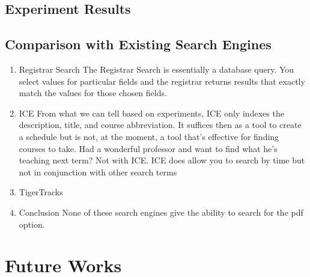 \documentclass[12pt,letterpaper]{article}
\begin{document}
	\subsection{Experiment Results}
	\subsection{Comparison with Existing Search Engines}
		\begin{enumerate}
			\item Registrar Search
				The Registrar Search is essentially a database query. You select values for particular fields and the registrar returns results that exactly match the values for those chosen fields.
			
			\item ICE
				From what we can tell based on experiments, ICE only indexes the description, title, and course abbreviation. It suffices then as a tool to create a schedule but is not, at the moment, a tool that's effective for finding courses to take. Had a wonderful professor and want to find what he's teaching next term? Not with ICE. ICE does allow you to search by time but not in conjunction with other search terms 
			
			\item TigerTracks
			
			\item Conclusion
				None of these search engines give the ability to search for the pdf option. 
		\end{enumerate}

\section{Future Works}
\end{document}
